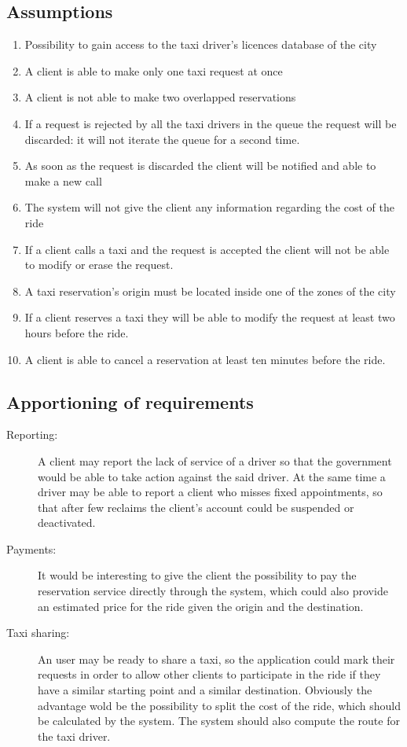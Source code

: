 \documentclass[a4paper]{article}
\begin{document}
\subsection{Assumptions}
\begin{enumerate}[label=\bfseries A\arabic*:]
\item Possibility to gain access to the taxi driver's licences database of the city
\item A client is able to make only one taxi request at once
\item A client is not able to make two overlapped reservations
\item If a request is rejected by all the taxi drivers in the queue the request will be discarded: it will not iterate the queue for a second time.
\item As soon as the request is discarded the client will be notified and able to make a new call
\item The system will not give the client any information regarding the cost of the ride
\item If a client calls a taxi and the request is accepted the client will not be able to modify or erase the request.
\item A taxi reservation's origin must be located inside one of the zones of the city
\item If a client reserves a taxi they will be able to modify the request at least two hours before the ride.
\item A client is able to cancel a reservation at least ten minutes before the ride.
\end{enumerate}

\subsection{Apportioning of requirements}
\begin{description}
\item[Reporting:] A client may report the lack of service of a driver so that the government would be able to take action against the said driver. At the same time a driver may be able to report a client who misses fixed appointments, so that after few reclaims the client's account could be suspended or deactivated. 
\item[Payments:] It would be interesting to give the client the possibility to pay the reservation service directly through the system, which could also provide an estimated price for the ride given the origin and the destination.
\item[Taxi sharing:] An user may be ready to share a taxi, so the application could mark their requests in order to allow other clients to participate in the ride if they have a similar starting point and a similar destination. Obviously the advantage wold be the possibility to split the cost of the ride, which should be calculated by the system. The system should also compute the route for the taxi driver.
\end{description}
\end{document}
